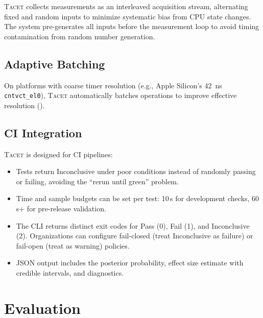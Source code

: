 \documentclass[letterpaper,twocolumn,10pt]{article}
\newcommand{\tacet}{\textsc{Tacet}\xspace}
\newcommand{\ns}[1]{\SI{#1}{\nano\second}}
\begin{document}
\tacet collects measurements as an interleaved acquisition stream, alternating
fixed and random inputs to minimize systematic bias from CPU state changes. The
system pre-generates all inputs before the measurement loop to avoid timing
contamination from random number generation.

\subsection{Adaptive Batching}
\label{sec:implementation:batching}

On platforms with coarse timer resolution (e.g., Apple Silicon's \ns{42}
\texttt{cntvct\_el0}), \tacet automatically batches operations to improve
effective resolution ().

\subsection{CI Integration}
\label{sec:implementation:bindings}

\tacet is designed for CI pipelines:

\begin{itemize}
    \item Tests return Inconclusive under poor conditions instead of randomly
          passing or failing, avoiding the ``rerun until green'' problem.

    \item Time and sample budgets can be set per test: 10\,s for development
          checks, 60\,s+ for pre-release validation.

    \item The CLI returns distinct exit codes for Pass (0), Fail (1), and
          Inconclusive (2). Organizations can configure fail-closed (treat
          Inconclusive as failure) or fail-open (treat as warning) policies.

    \item JSON output includes the posterior probability, effect size estimate
          with credible intervals, and diagnostics.
\end{itemize}

\section{Evaluation}
\label{sec:evaluation}
\end{document}
